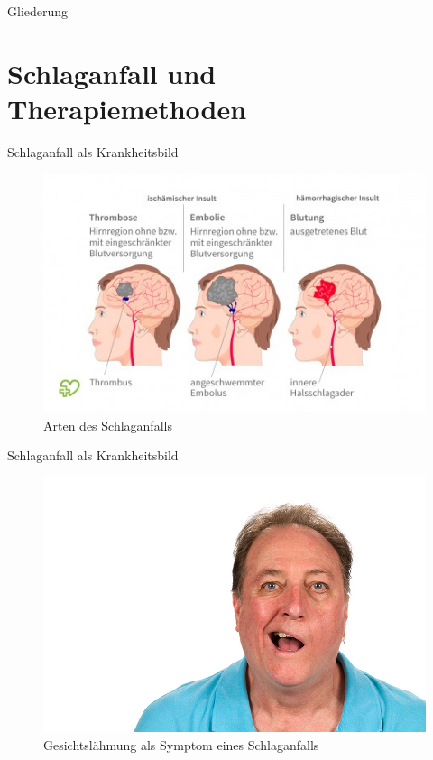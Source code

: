 \documentclass[hyphens]{beamer}
\begin{document}
 
 \titlepage

 \begin{frame}{Gliederung}
 \tableofcontents
 \end{frame}

\section{Schlaganfall und Therapiemethoden}

\begin{frame}{Schlaganfall als Krankheitsbild}
\begin{figure}
	\includegraphics[scale=0.6]{pics/sentst}
	\caption{Arten des Schlaganfalls}
\end{figure}
\end{frame}

\begin{frame}{Schlaganfall als Krankheitsbild}
\begin{figure}
	\includegraphics[scale=1.1]{pics/laehm}
	\caption{Gesichtslähmung als Symptom eines Schlaganfalls}
\end{figure}
\end{frame}
\end{document}
